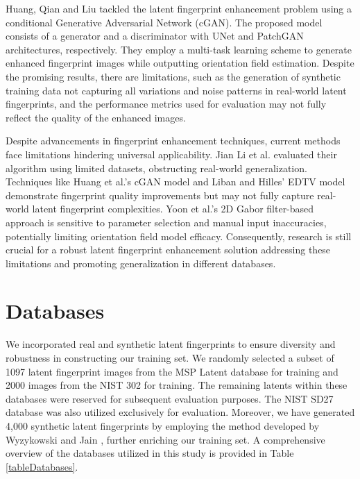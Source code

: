 \documentclass[twocolumn, switch]{article} %
\begin{document}
Huang, Qian and Liu \cite{huang2020latent} tackled the latent fingerprint enhancement problem using a conditional Generative Adversarial Network (cGAN). The proposed model consists of a generator and a discriminator with UNet \cite{DBLP:journals/corr/RonnebergerFB15} and PatchGAN \cite{DBLP:journals/corr/IsolaZZE16} architectures, respectively. They employ a multi-task learning scheme to generate enhanced fingerprint images while outputting orientation field estimation. Despite the promising results, there are limitations, such as the generation of synthetic training data not capturing all variations and noise patterns in real-world latent fingerprints, and the performance metrics used for evaluation may not fully reflect the quality of the enhanced images. 

Despite advancements in fingerprint enhancement techniques, current methods face limitations hindering universal applicability. Jian Li et al. \cite{li2018deep} evaluated their algorithm using limited datasets, obstructing real-world generalization. Techniques like Huang et al.'s cGAN model \cite{huang2020latent} and Liban and Hilles' EDTV model \cite{liban2018latent} demonstrate fingerprint quality improvements but may not fully capture real-world latent fingerprint complexities. Yoon et al.'s 2D Gabor filter-based approach \cite{yoon2010latent} is sensitive to parameter selection and manual input inaccuracies, potentially limiting orientation field model efficacy. Consequently, research is still crucial for a robust latent fingerprint enhancement solution addressing these limitations and promoting generalization in different databases.

\section{Databases}

We incorporated real and synthetic latent fingerprints to ensure diversity and robustness in constructing our training set. We randomly selected a subset of 1097 latent fingerprint images from the MSP Latent database \cite{yoon2015longitudinal} for training and 2000 images from the NIST 302 \cite{fiumara2019nist} for training. The remaining latents within these databases were reserved for subsequent evaluation purposes. The  NIST SD27 database \cite{garris2000nist} was also utilized exclusively for evaluation. Moreover, we have generated 4,000 synthetic latent fingerprints by employing the method developed by Wyzykowski and Jain \cite{Wyzykowski_2023_WACV}, further enriching our training set. A comprehensive overview of the databases utilized in this study is provided in Table \ref{tableDatabases}.
\end{document}
